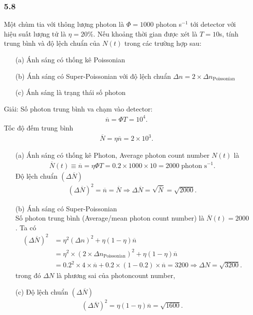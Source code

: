 \documentclass{report}
\begin{document}
\subsubsection*{5.8}
Một chùm tia với thông lượng photon là $\Phi = 1000$ photon s$^{-1}$ tới detector với hiệu suất lượng tử là $\eta = 20 \%$. Nếu khoảng thời gian được xét là $T = 10$s, tính trung bình và độ lệch chuẩn của $N(t)$ trong các trường hợp sau:
\begin{enumerate}
	\item[(a)] Ánh sáng có thống kê Poissonian
	\item[(b)] Ánh sáng có Super-Poissonian với độ lệch chuẩn $\Delta n = 2\times \Delta n_{\text{Poissonian}}$
	\item[(c)] Ánh sáng là trạng thái số photon
\end{enumerate}
Giải:
Số photon trung bình va chạm vào detector:
\begin{align*}
	\overline{n} = \Phi T = 10^4.
\end{align*}
Tốc độ đếm trung bình
\begin{align*}
	\overline{N} = \eta \overline{n} = 2\times 10^3.
\end{align*}
\begin{enumerate}
	\item[(a)] Ánh sáng có thống kê Photon, Average photon count number $N(t)$ là
	\begin{align*}
		\overline{N}(t) \equiv \overline{n}= \eta \Phi T = 0.2 \times 1000 \times 10 = 2000 \; \text{photon s}^{-1}.
	\end{align*}
	Độ lệch chuẩn $(\Delta \overline{N})$
	\begin{align*}
		(\Delta \overline{N})^2 = \overline{n} = \overline{N} \Rightarrow \Delta \overline{N} = \sqrt{\overline{N}} = \sqrt{2000}.
	\end{align*}
	\item[(b)] Ánh sáng có Super-Poissonian\\
	Số photon trung bình (Average/mean photon count number) là $\overline{N}(t) = 2000$. Ta có
	\begin{align*}
		(\Delta \overline{N})^2
		& = \eta^2 (\Delta n)^2 + \eta ( 1 - \eta ) \overline{n} \tag{5.56 M.Fox}                                                                     \\
		& =  \eta^2 \times (2 \times \Delta n_{\text{Poissonian}})^2 + \eta ( 1 - \eta ) \overline{n}                                                 \\
		& = 0.2^2 \times 4 \times \overline{n} + 0.2 \times (1 - 0.2) \times \overline{n} = 3200 \Rightarrow \Delta N = \sqrt{3200}. \tag{5.15 M.Fox}
	\end{align*}
	trong đó $\Delta N$ là phương sai của photoncount number,
	\item[(c)]
	Độ lệch chuẩn $(\Delta \overline{N})$
	\begin{align*}
		(\Delta \overline{N})^2 = \eta(1-\eta) \overline{n} = \sqrt{1600}.
	\end{align*}
\end{enumerate}
\end{document}
